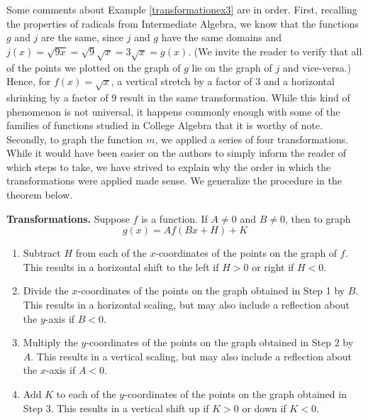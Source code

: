Some comments about Example \ref{transformationex3} are in order.  First, recalling the properties of radicals from Intermediate Algebra, we know that the functions $g$ and $j$ are the same, since $j$ and $g$ have the same domains and $j(x) = \sqrt{9x} = \sqrt{9} \sqrt{x} = 3 \sqrt{x} = g(x)$. (We invite the reader to verify that all of the points we plotted on the graph of $g$ lie on the graph of $j$ and vice-versa.)  Hence, for  $f(x) = \sqrt{x}$, a vertical stretch by a factor of $3$ and a horizontal shrinking by a factor of $9$ result in the same transformation.  While this kind of phenomenon is not universal, it happens commonly enough with some of the families of functions studied in College Algebra that it is worthy of note.  Secondly, to graph the function $m$, we applied a series of four transformations.  While it would have been easier on the authors to simply inform the reader of which steps to take, we have strived to explain why the order in which the transformations were applied made sense.  We generalize the procedure in the theorem below.

\bigskip

\bbm


\begin{thm} \label{transformationsthm}\textbf{Transformations.}  Suppose $f$ is a function.  If $A \neq 0$ and $B \neq 0$, then to graph \[g(x) = A f(Bx+H)+K\] 

\begin{enumerate}

\item  Subtract $H$ from each of the $x$-coordinates of the points on the graph of $f$.  This results in a horizontal shift to the left if $H > 0$ or right if $H< 0$.

\item  Divide the $x$-coordinates of the points on the graph obtained in Step 1 by $B$.  This results in a horizontal scaling, but may also include a reflection about the $y$-axis if $B < 0$.

\item  Multiply the $y$-coordinates of the points on the graph obtained in Step 2 by $A$.   This results in a vertical scaling, but may also include a reflection about the $x$-axis if $A < 0$.

\item  Add $K$ to each of the $y$-coordinates of the points on the graph obtained in Step 3.  This results in a vertical shift up if $K > 0$ or down if $K< 0$.

\end{enumerate}

\end{thm}

